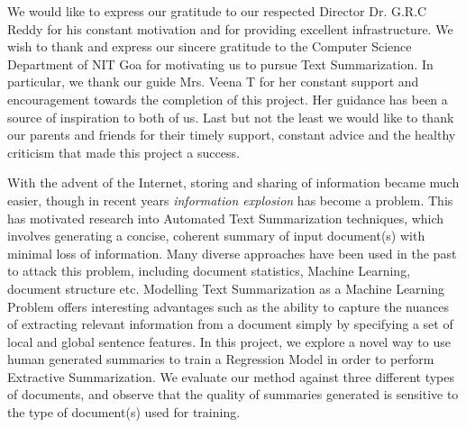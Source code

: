 \documentclass[BTech]{nitgoathesis}
\begin{document}
\acknowledgements

We  would like to express our gratitude to our respected Director Dr. G.R.C Reddy for his constant motivation and for providing excellent infrastructure. 
We wish to thank and express our sincere gratitude to the Computer Science Department of NIT Goa for motivating us to pursue Text Summarization. In particular, we thank our guide Mrs. Veena T for her constant support and encouragement towards the completion of this project.  Her guidance has been a source of inspiration to both of us.
Last but not the least we would like to thank our parents and friends for their timely support, constant advice and the healthy criticism that made this project a success.


\abstract
With the advent of the Internet, storing and sharing of information became much easier, though in recent years \emph{information explosion} has become a problem. This has motivated research into Automated Text Summarization techniques, which involves generating a concise, coherent summary of input document(s) with minimal loss of information. Many diverse approaches have been used in the past to attack this problem, including document statistics, Machine Learning, document structure etc. Modelling Text Summarization as a Machine Learning Problem offers interesting advantages such as the ability to capture the nuances of extracting relevant information from a document simply by specifying a set of local and global sentence features. In this project, we explore a novel way to use human generated summaries to train a Regression Model in order to perform Extractive Summarization. We evaluate our method against three different types of documents, and observe that the quality of summaries generated is sensitive to the type of document(s) used for training.

% 

\pagebreak


\begin{singlespace}
\tableofcontents
\thispagestyle{empty}


\listoffigures
{}
\end{singlespace}
\end{document}
